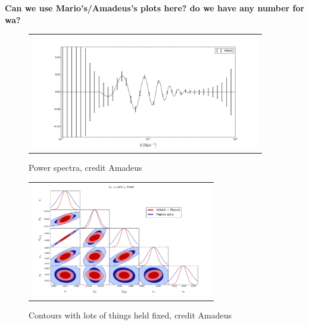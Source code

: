 \documentclass[]{spie}  %
\begin{document}
\textbf{Can we use Mario's/Amadeus's plots here? do we have any number for wa?}

 \begin{figure} [ht]
  \begin{center}
   \begin{tabular}{c} %
   \includegraphics[height=5cm]{fbao_constraints_hirax.png}
   \end{tabular}
   \end{center}
   \caption[Power Spectra] 
   { \label{fig:pspec} 
Power spectra, credit Amadeus }
   \end{figure} 

  \begin{figure} [ht]
  \begin{center}
   \begin{tabular}{c} %
   \includegraphics[height=5cm]{5pellipses_justHIRAX1.png}
   \end{tabular}
   \end{center}
   \caption[Contours] 
   { \label{fig:contours} 
Contours with lots of things held fixed, credit Amadeus}
   \end{figure} 
\end{document}
